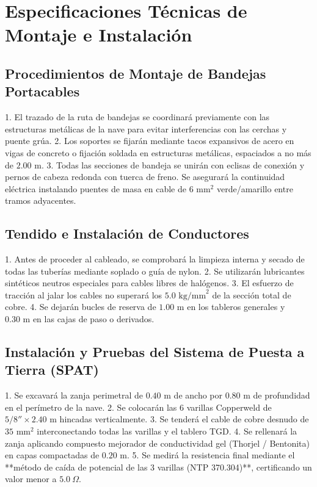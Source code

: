 \chapter{Especificaciones Técnicas de Montaje e Instalación}

\section{Procedimientos de Montaje de Bandejas Portacables}
1. El trazado de la ruta de bandejas se coordinará previamente con las estructuras metálicas de la nave para evitar interferencias con las cerchas y puente grúa.
2. Los soportes se fijarán mediante tacos expansivos de acero en vigas de concreto o fijación soldada en estructuras metálicas, espaciados a no más de $2.00\text{ m}$.
3. Todas las secciones de bandeja se unirán con eclisas de conexión y pernos de cabeza redonda con tuerca de freno. Se asegurará la continuidad eléctrica instalando puentes de masa en cable de $6\text{ mm}^2$ verde/amarillo entre tramos adyacentes.

\section{Tendido e Instalación de Conductores}
1. Antes de proceder al cableado, se comprobará la limpieza interna y secado de todas las tuberías mediante soplado o guía de nylon.
2. Se utilizarán lubricantes sintéticos neutros especiales para cables libres de halógenos.
3. El esfuerzo de tracción al jalar los cables no superará los $5.0\text{ kg/mm}^2$ de la sección total de cobre.
4. Se dejarán bucles de reserva de $1.00\text{ m}$ en los tableros generales y $0.30\text{ m}$ en las cajas de paso o derivados.

\section{Instalación y Pruebas del Sistema de Puesta a Tierra (SPAT)}
1. Se excavará la zanja perimetral de $0.40\text{ m}$ de ancho por $0.80\text{ m}$ de profundidad en el perímetro de la nave.
2. Se colocarán las 6 varillas Copperweld de $5/8'' \times 2.40\text{ m}$ hincadas verticalmente.
3. Se tenderá el cable de cobre desnudo de $35\text{ mm}^2$ interconectando todas las varillas y el tablero TGD.
4. Se rellenará la zanja aplicando compuesto mejorador de conductividad gel (Thorjel / Bentonita) en capas compactadas de $0.20\text{ m}$.
5. Se medirá la resistencia final mediante el **método de caída de potencial de las 3 varillas (NTP 370.304)**, certificando un valor menor a $5.0 \:\Omega$.

